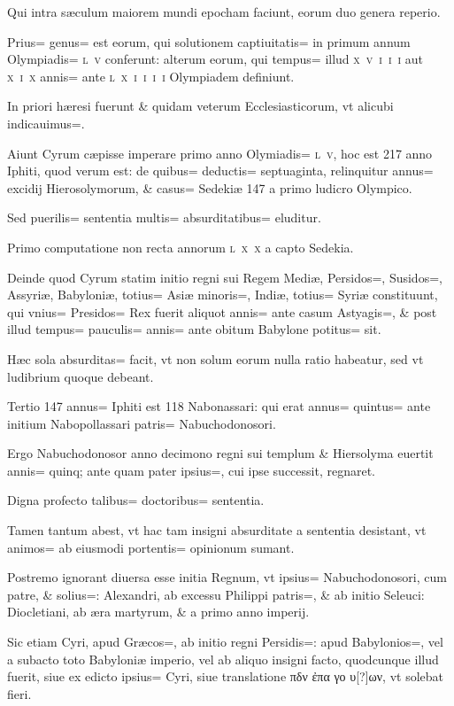\begin{parnumbers}
Qui intra sæculum maiorem mundi epocham faciunt, eorum duo genera reperio.

Prius= genus= est eorum, qui solutionem captiuitatis= in primum annum Olympiadis= \textsc{l~v} conferunt: alterum eorum, qui tempus= illud \textsc{x~v~i~i~i} aut \textsc{x~i~x} annis= ante \textsc{l~x~i~i~i~i} Olympiadem definiunt.

In priori hæresi fuerunt \& quidam veterum Ecclesiasticorum, vt alicubi indicauimus=. 

Aiunt Cyrum cæpisse imperare primo anno Olymiadis= \textsc{l~v}, hoc est 217 anno Iphiti, quod verum est: de quibus= deductis= septuaginta, relinquitur annus= excidij Hierosolymorum, \& casus= Sedekiæ 147 a primo ludicro Olympico.

Sed puerilis= sententia multis= absurditatibus= eluditur.

Primo computatione non recta annorum \textsc{l~x~x} a capto Sedekia.

Deinde quod Cyrum statim initio regni sui Regem Mediæ, Persidos=, Susidos=, Assyriæ, Babyloniæ, totius= Asiæ minoris=, Indiæ, totius= Syriæ constituunt, qui vnius= Presidos= Rex fuerit aliquot annis= ante casum Astyagis=, \& post illud tempus= pauculis= annis= ante obitum Babylone potitus= sit.

Hæc sola absurditas= facit, vt non solum eorum nulla ratio habeatur, sed vt ludibrium quoque debeant.

Tertio 147 annus= Iphiti est 118 Nabonassari: qui erat annus= quintus= ante initium Nabopollassari patris= Nabuchodonosori.

Ergo Nabuchodonosor anno decimono regni sui templum \& Hiersolyma euertit annis= quinq;
ante quam pater ipsius=, cui ipse successit, regnaret.

Digna profecto talibus= doctoribus= sententia.

Tamen tantum abest, vt hac tam insigni absurditate a sententia desistant, vt animos= ab eiusmodi portentis= opinionum sumant.

Postremo ignorant diuersa esse initia Regnum, vt ipsius= Nabuchodonosori, cum patre, \& solius=: Alexandri, ab excessu Philippi patris=, \& ab initio Seleuci: Diocletiani, ab æra martyrum, \& a primo anno imperij.

Sic etiam Cyri, apud Græcos=, ab initio regni Persidis=: apud Babylonios=, vel a subacto toto Babyloniæ imperio, vel ab aliquo insigni facto, quodcunque illud fuerit, siue ex edicto ipsius= Cyri, siue translatione πδν ἐπα γο υ[?]ων, vt solebat fieri.


\end{parnumbers}
